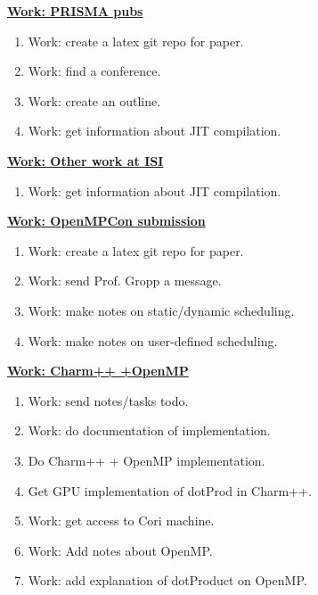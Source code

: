 \begin{minipage}{\columnwidth}
\underline{\bf \tiny {Work: PRISMA pubs}}
\begin{enumerate}
\tiny \item \tiny Work: create a latex git repo for paper.
\item \tiny Work: find a conference.
\item \tiny Work: create an outline.
\item \tiny Work: get information about JIT compilation.
\end{enumerate}
\end{minipage}

\begin{minipage}{\columnwidth}
\underline{\bf \tiny {Work: Other work at ISI}}
\begin{enumerate}
\item \tiny Work: get information about JIT compilation.
\end{enumerate}
\end{minipage}

\begin{minipage}{\columnwidth}
\underline{\bf \tiny {Work: OpenMPCon submission}}
\begin{enumerate}
\tiny \item \tiny Work: create a latex git repo for paper.
\item \tiny Work: send Prof. Gropp a message.
\item \tiny Work: make notes on static/dynamic scheduling.
\item \tiny Work: make notes on user-defined scheduling.
\end{enumerate}
\end{minipage}

\begin{minipage}{\columnwidth}
\underline{\bf \tiny {Work: Charm++ +OpenMP}}
\begin{enumerate}
\tiny \item \tiny Work: send notes/tasks todo.
\item \tiny Work: do documentation of implementation.
\item \tiny Do Charm++ + OpenMP implementation.
\item \tiny Get GPU implementation of dotProd in Charm++.
\item \tiny Work: get access to Cori machine.
\item \tiny Work: Add notes about OpenMP.
\item \tiny Work: add explanation of dotProduct on OpenMP.
\end{enumerate}
\end{minipage}


